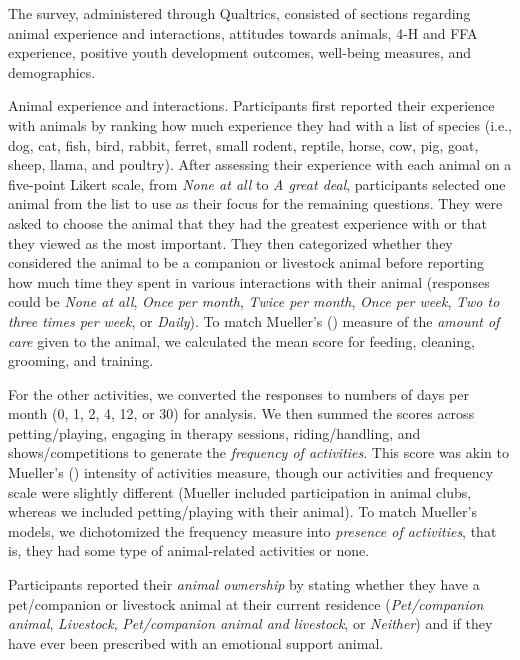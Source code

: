 \documentclass[
  jou,
  longtable,
  nolmodern,
  notxfonts,
  notimes,
  colorlinks=true,linkcolor=blue,citecolor=blue,urlcolor=blue]{apa7}
\begin{document}
The survey, administered through Qualtrics, consisted of sections
regarding animal experience and interactions, attitudes towards animals,
4-H and FFA experience, positive youth development outcomes, well-being
measures, and demographics.

{Animal experience and interactions.} Participants first reported their
experience with animals by ranking how much experience they had with a
list of species (i.e., dog, cat, fish, bird, rabbit, ferret, small
rodent, reptile, horse, cow, pig, goat, sheep, llama, and poultry).
After assessing their experience with each animal on a five-point Likert
scale, from \emph{None at all} to \emph{A great deal}, participants
selected one animal from the list to use as their focus for the
remaining questions. They were asked to choose the animal that they had
the greatest experience with or that they viewed as the most important.
They then categorized whether they considered the animal to be a
companion or livestock animal before reporting how much time they spent
in various interactions with their animal (responses could be \emph{None
at all}, \emph{Once per month}, \emph{Twice per month}, \emph{Once per
week}, \emph{Two to three times per week}, or \emph{Daily}). To match
Mueller's () measure of the
\emph{amount of care} given to the animal, we calculated the mean score
for feeding, cleaning, grooming, and training.

For the other activities, we converted the responses to numbers of days
per month (0, 1, 2, 4, 12, or 30) for analysis. We then summed the
scores across petting/playing, engaging in therapy sessions,
riding/handling, and shows/competitions to generate the \emph{frequency
of activities}. This score was akin to Mueller's
() intensity of activities measure,
though our activities and frequency scale were slightly different
(Mueller included participation in animal clubs, whereas we included
petting/playing with their animal). To match Mueller's models, we
dichotomized the frequency measure into \emph{presence of activities},
that is, they had some type of animal-related activities or none.

Participants reported their \emph{animal ownership} by stating whether
they have a pet/companion or livestock animal at their current residence
(\emph{Pet/companion animal}, \emph{Livestock}, \emph{Pet/companion
animal and livestock}, or \emph{Neither}) and if they have ever been
prescribed with an emotional support animal.
\end{document}
